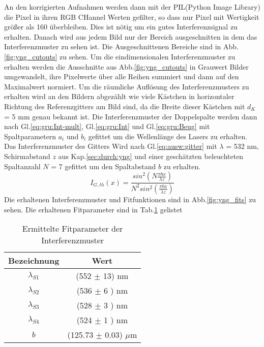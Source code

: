 An den korrigierten Aufnahmen werden dann mit der PIL(Python Image Library) die Pixel in ihren RGB CHannel Werten gefilter, so dass nur Pixel mit Wertigkeit größer als 160 überbleiben.
Dies ist nötig um ein gutes Interferenzsignal zu erhalten.
Danach wird aus jedem Bild nur der Bereich ausgeschnitten in dem das Interferenzmuster zu sehen ist.
Die Ausgeschnittenen Bereiche sind in Abb.\ref{fig:yng_cutouts} zu sehen.
Um die eindimensionalen Interferenzmuster zu erhalten werden die Ausschnitte aus Abb.\ref{fig:yng_cutouts} in Grauwert Bilder umgewandelt, ihre Pixelwerte über alle Reihen summiert und dann auf den Maximalwert normiert.
Um die räumliche Auflösung des Interferenzmusters zu erhalten wird an den Bildern abgezählt wie viele Kästchen in horizontaler Richtung des Referenzgitters am Bild sind, da die Breite dieser Kästchen mit $d_K$ = 5 mm genau bekannt ist.
Die Interferenzmuster der Doppelspalte werden dann nach Gl.\ref{eq:gru:Int-mult}, Gl.\ref{eq:gru:Int} und Gl.\ref{eq:gru:Beug} mit Spaltparametern $a_i$ und $b_i$ gefittet um die Wellenlänge des Lasers zu erhalten.
Das Interferenzmuster des Gitters Wird nach Gl.\ref{eq:ausw:gitter} mit $\lambda$ = 532 nm, Schirmabstand $z$ aus Kap.\ref{sec:durch:yng} und einer geschätzten beleuchteten Spaltanzahl $N$ = 7 gefittet um den Spaltabstand $b$ zu erhalten.
\begin{equation}
    I_{G,th}(x) = \frac{sin^2\left(N \frac{\pi b x}{\lambda z}\right)}{N^2 sin^2\left(\frac{\pi b x}{\lambda z}\right)}
    \label{eq:ausw:gitter}
\end{equation}
Die erhaltenen Interferenzmuster und Fitfunktionen sind in Abb.\ref{fig:yng_fits} zu sehen.
Die erhaltenen Fitparameter sind in Tab.\ref{tab:yng-Werte} gelistet
\begin{table}[H]
    \centering
    \caption{
        Ermittelte Fitparameter der Interferenzmuster
    }
    \begin{tabular}{cc} \hline
        Bezeichnung & Wert \\ \hline
        $\lambda_{S1}$  & (552 $\pm$ 13) nm \\ \hline
        $\lambda_{S2}$  & (536 $\pm$ 6 ) nm\\ \hline
        $\lambda_{S3}$  & (528 $\pm$ 3 ) nm\\ \hline
        $\lambda_{S4}$  & (524 $\pm$ 1 ) nm\\ \hline
        $b$  & (125.73 $\pm$ 0.03) $\mu$m \\ \hline
    \end{tabular}
    \label{tab:yng-Werte}
\end{table}

